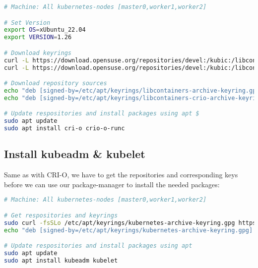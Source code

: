 \begin{lstlisting}[language=bash,caption=Add CRI-O repositories]
# Machine: All kubernetes-nodes [master0,worker1,worker2]

# Set Version
export OS=xUbuntu_22.04
export VERSION=1.26

# Download keyrings
curl -L https://download.opensuse.org/repositories/devel:/kubic:/libcontainers:/stable/$OS/Release.key | sudo gpg --dearmor -o /etc/apt/keyrings/libcontainers-archive-keyring.gpg
curl -L https://download.opensuse.org/repositories/devel:/kubic:/libcontainers:/stable:/cri-o:/$VERSION/$OS/Release.key | sudo gpg --dearmor -o /etc/apt/keyrings/libcontainers-crio-archive-keyring.gpg

# Download repository sources
echo "deb [signed-by=/etc/apt/keyrings/libcontainers-archive-keyring.gpg] https://download.opensuse.org/repositories/devel:/kubic:/libcontainers:/stable/$OS/ /" | sudo tee /etc/apt/sources.list.d/devel:kubic:libcontainers:stable.list
echo "deb [signed-by=/etc/apt/keyrings/libcontainers-crio-archive-keyring.gpg] https://download.opensuse.org/repositories/devel:/kubic:/libcontainers:/stable:/cri-o:/$VERSION/$OS/ /" | sudo tee /etc/apt/sources.list.d/devel:kubic:libcontainers:stable:cri-o:$VERSION.list

# Update respositories and install packages using apt $
sudo apt update
sudo apt install cri-o crio-o-runc 
\end{lstlisting}

\subsection{Install kubeadm \& kubelet} \label{kubernetes-keyrings}
Same as with CRI-O, we have to get the repositories and corresponding keys before we can use our package-manager to install the needed packages:

\begin{lstlisting}[language=bash, caption=Get kubernetes keyrings and install kubeadm and kubelet] 
# Machine: All kubernetes-nodes [master0,worker1,worker2]

# Get respositories and keyrings
sudo curl -fsSLo /etc/apt/keyrings/kubernetes-archive-keyring.gpg https://packages.cloud.google.com/apt/doc/apt-key.gpg
echo "deb [signed-by=/etc/apt/keyrings/kubernetes-archive-keyring.gpg] https://apt.kubernetes.io/ kubernetes-xenial main" | sudo tee /etc/apt/sources.list.d/kubernetes.list

# Update respositories and install packages using apt
sudo apt update
sudo apt install kubeadm kubelet
\end{lstlisting}

